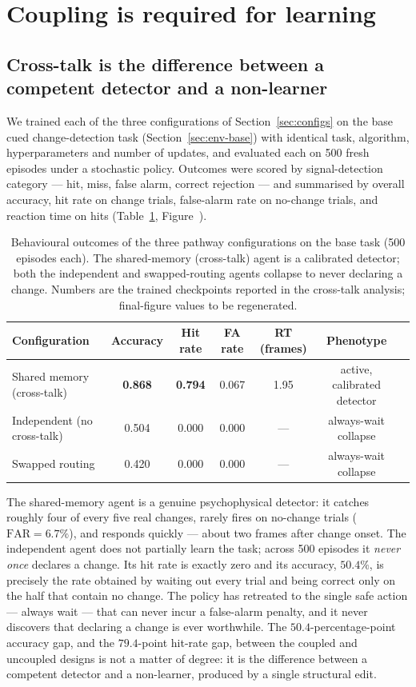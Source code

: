 \section{Coupling is required for learning}
\label{sec:results}

\subsection{Cross-talk is the difference between a competent detector and a
non-learner}
\label{sec:results-main}
We trained each of the three configurations of Section~\ref{sec:configs} on the
base cued change-detection task (Section~\ref{sec:env-base}) with identical task,
algorithm, hyperparameters and number of updates, and evaluated each on 500 fresh
episodes under a stochastic policy. Outcomes were scored by signal-detection
category --- hit, miss, false alarm, correct rejection --- and summarised by
overall accuracy, hit rate on change trials, false-alarm rate on no-change trials,
and reaction time on hits (Table~\ref{tab:configs}, Figure~).

\begin{table}[t]
\centering
\caption{Behavioural outcomes of the three pathway configurations on the base task
(500 episodes each). The shared-memory (cross-talk) agent is a calibrated detector;
both the independent and swapped-routing agents collapse to never declaring a
change. Numbers are the trained checkpoints reported in the cross-talk analysis;
final-figure values to be regenerated.}
\label{tab:configs}
\small
\begin{tabular}{lcccccl}
\toprule
Configuration & Accuracy & Hit rate & FA rate & RT (frames) & Phenotype \\
\midrule
Shared memory (cross-talk) & \textbf{0.868} & \textbf{0.794} & 0.067 & 1.95 & active, calibrated detector \\
Independent (no cross-talk) & 0.504 & 0.000 & 0.000 & --- & always-wait collapse \\
Swapped routing & 0.420 & 0.000 & 0.000 & --- & always-wait collapse \\
\bottomrule
\end{tabular}
\end{table}

The shared-memory agent is a genuine psychophysical detector: it catches roughly
four of every five real changes, rarely fires on no-change trials
($\mathrm{FAR}=6.7\%$), and responds quickly --- about two frames after change
onset. The independent agent does not partially learn the task; across 500 episodes
it \emph{never once} declares a change. Its hit rate is exactly zero and its
accuracy, $50.4\%$, is precisely the rate obtained by waiting out every trial and
being correct only on the half that contain no change. The policy has retreated to
the single safe action --- always wait --- that can never incur a false-alarm
penalty, and it never discovers that declaring a change is ever worthwhile. The
$50.4$-percentage-point accuracy gap, and the $79.4$-point hit-rate gap, between the
coupled and uncoupled designs is not a matter of degree: it is the difference
between a competent detector and a non-learner, produced by a single structural edit.


